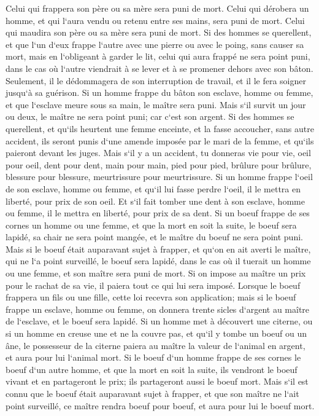 \verse Celui qui frappera son père ou sa mère sera puni de mort. 
\verse Celui qui dérobera un homme, et qui l`aura vendu ou retenu entre ses mains, sera puni de mort. 
\verse Celui qui maudira son père ou sa mère sera puni de mort. 
\verse Si des hommes se querellent, et que l`un d`eux frappe l`autre avec une pierre ou avec le poing, sans causer sa mort, mais en l`obligeant à garder le lit, 
\verse celui qui aura frappé ne sera point puni, dans le cas où l`autre viendrait à se lever et à se promener dehors avec son bâton. Seulement, il le dédommagera de son interruption de travail, et il le fera soigner jusqu`à sa guérison. 
\verse Si un homme frappe du bâton son esclave, homme ou femme, et que l`esclave meure sous sa main, le maître sera puni. 
\verse Mais s`il survit un jour ou deux, le maître ne sera point puni; car c`est son argent. 
\verse Si des hommes se querellent, et qu`ils heurtent une femme enceinte, et la fasse accoucher, sans autre accident, ils seront punis d`une amende imposée par le mari de la femme, et qu`ils paieront devant les juges. 
\verse Mais s`il y a un accident, tu donneras vie pour vie, 
\verse oeil pour oeil, dent pour dent, main pour main, pied pour pied, 
\verse brûlure pour brûlure, blessure pour blessure, meurtrissure pour meurtrissure. 
\verse Si un homme frappe l`oeil de son esclave, homme ou femme, et qu`il lui fasse perdre l`oeil, il le mettra en liberté, pour prix de son oeil. 
\verse Et s`il fait tomber une dent à son esclave, homme ou femme, il le mettra en liberté, pour prix de sa dent. 
\verse Si un boeuf frappe de ses cornes un homme ou une femme, et que la mort en soit la suite, le boeuf sera lapidé, sa chair ne sera point mangée, et le maître du boeuf ne sera point puni. 
\verse Mais si le boeuf était auparavant sujet à frapper, et qu`on en ait averti le maître, qui ne l`a point surveillé, le boeuf sera lapidé, dans le cas où il tuerait un homme ou une femme, et son maître sera puni de mort. 
\verse Si on impose au maître un prix pour le rachat de sa vie, il paiera tout ce qui lui sera imposé. 
\verse Lorsque le boeuf frappera un fils ou une fille, cette loi recevra son application; 
\verse mais si le boeuf frappe un esclave, homme ou femme, on donnera trente sicles d`argent au maître de l`esclave, et le boeuf sera lapidé. 
\verse Si un homme met à découvert une citerne, ou si un homme en creuse une et ne la couvre pas, et qu`il y tombe un boeuf ou un âne, 
\verse le possesseur de la citerne paiera au maître la valeur de l`animal en argent, et aura pour lui l`animal mort. 
\verse Si le boeuf d`un homme frappe de ses cornes le boeuf d`un autre homme, et que la mort en soit la suite, ils vendront le boeuf vivant et en partageront le prix; ils partageront aussi le boeuf mort. 
\verse Mais s`il est connu que le boeuf était auparavant sujet à frapper, et que son maître ne l`ait point surveillé, ce maître rendra boeuf pour boeuf, et aura pour lui le boeuf mort. 

